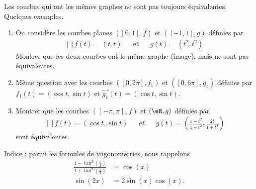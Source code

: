 \begin{exercice}\label{exoCourbesSurfaces0001}

	Les courbes qui ont les mêmes graphes ne sont pas toujours équivalentes. Quelques exemples.
	\begin{enumerate}
		\item
 On considère les courbes planes $([0,1], f)$ et  $([-1,1], g)$ définies par
 \begin{equation}
	 \begin{aligned}[]
		 f(t) = (t, t) &&\text{et}&& g(t)= (t^2, t^2).
	 \end{aligned}
 \end{equation}
Montrer que les deux courbes ont le même graphe (image), mais ne sont pas équivalentes.

\item
Même question avec les courbes $([0, 2 \pi], f_1)$ et  $([0, 6\pi], g_1)$ définies par $ f_1(t) = (\cos t, \sin t)$   et $ \vec{g_1}(t)= (\cos t, \sin t).$

\item
Montrer que les courbes $(\mathopen] -\pi , \pi \mathclose[, f)$ et $(\eR, g)$ définies par 
\begin{equation}
	\begin{aligned}[]
		f (t) = ( \cos t, \sin t) &&\text{et}&&  g(t) = \left( \frac{1-t^2}{1 + t^2}, \frac{ 2t}{ 1 + t^2} \right)
	\end{aligned}
\end{equation}
sont équivalentes.
			
	\end{enumerate}

    Indice : parmi les formules de trigonométries, nous rappelons 
    \begin{subequations}
        \begin{align}
            \frac{ 1-\tan^2\left( \frac{ x }{ 2 } \right) }{ 1+\tan^2\left( \frac{ x }{2} \right) }&=\cos(x)\\
            \sin(2x)&=2\sin(x)\cos(x).
        \end{align}
    \end{subequations}

\end{exercice}

